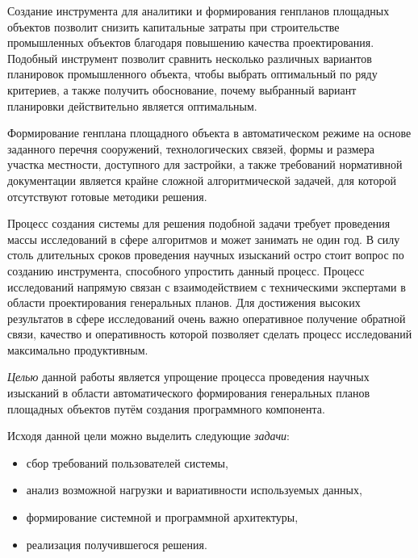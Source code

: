Создание инструмента для аналитики и формирования генпланов площадных объектов позволит снизить
капитальные затраты при строительстве промышленных объектов благодаря повышению качества проектирования.
Подобный инструмент позволит сравнить несколько различных вариантов планировок промышленного объекта,
чтобы выбрать оптимальный по ряду критериев, а также получить обоснование,
почему выбранный вариант планировки действительно является оптимальным.

Формирование генплана площадного объекта в автоматическом режиме
на основе заданного перечня сооружений, технологических связей,
формы и размера участка местности, доступного для застройки,
а также требований нормативной документации является
крайне сложной алгоритмической задачей, для которой отсутствуют готовые методики решения.

Процесс создания системы для решения подобной задачи требует
проведения массы исследований в сфере алгоритмов и может занимать не один год.
В силу столь длительных сроков проведения научных изысканий остро стоит вопрос по созданию инструмента,
способного упростить данный процесс.
Процесс исследований напрямую связан с взаимодействием с техническими экспертами
в области проектирования генеральных планов.
Для достижения высоких результатов в сфере исследований очень важно оперативное получение обратной связи,
качество и оперативность которой позволяет сделать процесс исследований максимально продуктивным.

\textit{Целью} данной работы является
упрощение процесса проведения научных изысканий
в области автоматического формирования генеральных планов площадных объектов
путём создания программного компонента.

Исходя данной цели можно выделить следующие \textit{задачи}:
\begin{itemize}
    \item сбор требований пользователей системы,
    \item анализ возможной нагрузки и вариативности используемых данных,
    \item формирование системной и программной архитектуры,
    \item реализация получившегося решения.
\end{itemize}
